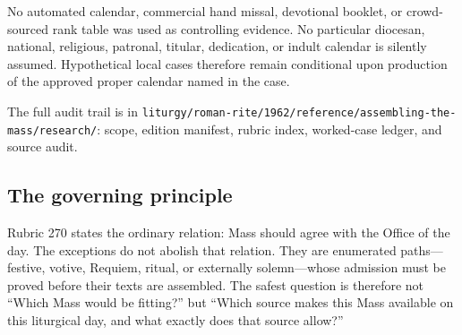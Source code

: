 {No automated calendar, commercial hand missal, devotional booklet, or crowd-sourced rank table was used as controlling evidence. No particular diocesan, national, religious, patronal, titular, dedication, or indult calendar is silently assumed. Hypothetical local cases therefore remain conditional upon production of the approved proper calendar named in the case.

The full audit trail is in \nolinkurl{liturgy/roman-rite/1962/reference/assembling-the-mass/research/}: scope, edition manifest, rubric index, worked-case ledger, and source audit.
}

\subsection{The governing principle}

Rubric 270 states the ordinary relation: Mass should agree with the Office of the day. The exceptions do not abolish that relation. They are enumerated paths---festive, votive, Requiem, ritual, or externally solemn---whose admission must be proved before their texts are assembled. The safest question is therefore not “Which Mass would be fitting?” but “Which source makes this Mass available on this liturgical day, and what exactly does that source allow?”
